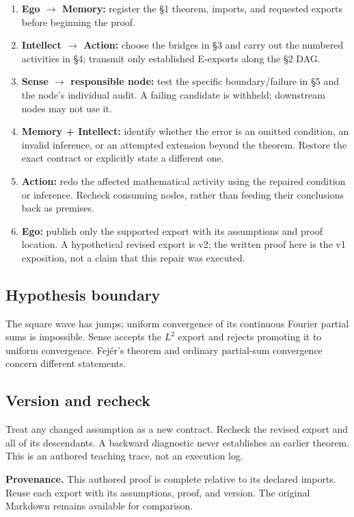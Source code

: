 \documentclass[preprint,12pt,aps,pra,showkeys,amsmath,amssymb,superscriptaddress,floatfix]{revtex4-2}
\theoremstyle{definition}
\theoremstyle{remark}
\providecommand{\tightlist}{\setlength{\itemsep}{2pt}\setlength{\parskip}{0pt}}
\begin{document}
\begin{enumerate}
\def\labelenumi{\arabic{enumi}.}
\tightlist
\item
  \textbf{Ego \(\to\) Memory:} register the §1 theorem, imports, and
  requested exports before beginning the proof.
\item
  \textbf{Intellect \(\to\) Action:} choose the bridges in §3 and carry
  out the numbered activities in §4; transmit only established E-exports
  along the §2 DAG.
\item
  \textbf{Sense \(\to\) responsible node:} test the specific
  boundary/failure in §5 and the node's individual audit. A failing
  candidate is withheld; downstream nodes may not use it.
\item
  \textbf{Memory + Intellect:} identify whether the error is an omitted
  condition, an invalid inference, or an attempted extension beyond the
  theorem. Restore the exact contract or explicitly state a different
  one.
\item
  \textbf{Action:} redo the affected mathematical activity using the
  repaired condition or inference. Recheck consuming nodes, rather than
  feeding their conclusions back as premises.
\item
  \textbf{Ego:} publish only the supported export with its assumptions
  and proof location. A hypothetical revised export is v2; the written
  proof here is the v1 exposition, not a claim that this repair was
  executed.
\end{enumerate}

\subsection{Hypothesis boundary}
The square wave has jumps; uniform convergence of its continuous Fourier
partial sums is impossible. Sense accepts the \(L^{2}\) export and
rejects promoting it to uniform convergence. Fejér's theorem and
ordinary partial-sum convergence concern different statements.

\subsection{Version and recheck}
Treat any changed assumption as a new contract. Recheck the revised
export and all of its descendants. A backward diagnostic never
establishes an earlier theorem. This is an authored teaching trace, not
an execution log.

\par\medskip\begingroup\small\linespread{1.0}\selectfont\noindent\textbf{Provenance.} This authored proof is complete relative to its declared imports. Reuse
each export with its assumptions, proof, and version. The original
Markdown remains available for comparison.
\par\endgroup
\end{document}
